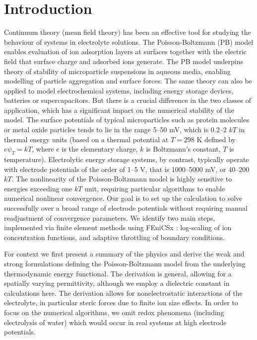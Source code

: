 \section*{Introduction}

Continuum theory (mean field theory) has been an effective tool for
studying the behaviour of systems in electrolyte solutions. The
Poisson-Boltzmann (PB) model \citep{Wu2022} enables evaluation of ion
adsorption layers at surfaces together with the electric field that
surface charge and adsorbed ions generate. The PB model underpins
theory of stability of microparticle suspensions in aqueous media,
enabling modelling of particle aggregation and surface forces. The
same theory can also be applied to model electrochemical
systems, including energy storage devices, batteries or
supercapacitors. But there is a crucial difference in the two classes
of application, which has a significant impact on the numerical
stability of the model.  The surface potentials
of typical microparticles such as protein molecules or metal oxide
particles tends to lie in the range 5--50 mV, which is 0.2--2
$kT$ in thermal energy units (based on a thermal potential at $T=298$
K defined by $e\psi_{T} = kT$, where $e$ is the elementary charge, $k$
is Boltzmann's constant, $T$ is temperature). Electrolytic energy
storage systems, by contrast, typically operate with electrode
potentials of the order of 1--5 V, that is 1000--5000 mV, or 40--200
$kT$.  The nonlinearity of the Poisson-Boltzmann model is highly
sensitive to energies exceeding one $kT$ unit, requiring particular
algorithms to enable numerical nonlinear convergence.  Our goal is to
set up the calculation to solve successfully over a broad range of
electrode potentials without requiring manual readjustment of
convergence parameters.  We identify two main steps, implemented via
finite element methods using FEniCSx \citep{baratta2023dolfinx}: log-scaling of
ion concentration functions, and adaptive throttling of boundary
conditions.

For context we first present a summary of the physics and
derive the
weak and strong formulations defining the Poisson-Boltzmann model from
the underlying thermodynamic energy functional. The derivation
is general, allowing for a spatially varying permittivity, although we
employ a dielectric constant in calculations here. The derivation
allows for nonelectrostatic interactions of the electrolyte, in
particular steric forces due to finite ion size effects.  
In order to focus on the numerical algorithms, we omit redox
phenomena (including electrolysis of water) which would occur in real
systems at  high electrode potentials.

